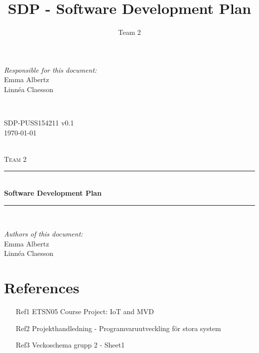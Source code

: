 \documentclass[a4paper]{article}
\title{SDP - Software Development Plan}
\author{Team 2}
\begin{document}
\begin{titlepage}
\newcommand{\HRule}{\rule{\linewidth}{0.5mm}}

\begin{minipage}{0.5\textwidth}
\begin{flushleft} %
\textit{Responsible for this document:}\\
Emma Albertz \\
Linnéa Claesson
\end{flushleft}
\end{minipage}
~
\begin{minipage}{0.4\textwidth}
\begin{flushright}
SDP-PUSS154211 v0.1 \\
\today
\end{flushright}
\end{minipage}\\[3cm]

\centering
\textsc{\LARGE Team 2}\\[0.5cm]

\HRule \\[0.4cm]
{ \huge \bfseries Software Development Plan}\\[0.4cm] %
\HRule \\[1.5cm]

\vfill
\begin{flushleft}
\textit{Authors of this document:}\\
Emma Albertz \\
Linnéa Claesson
\end{flushleft}



\end{titlepage}
\setcounter{tocdepth}{2}
\tableofcontents
\newpage
{}

\section{References}
\begin{itemize}
\item[Ref1] ETSN05 Course Project: IoT and MVD
\item[Ref2] Projekthandledning - Programvaruutveckling för stora system
\item[Ref3] Veckoschema grupp 2 - Sheet1
\end{itemize}
\end{document}

